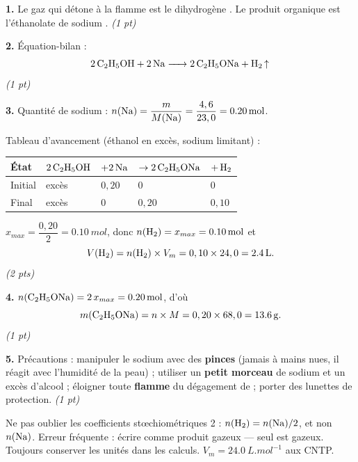 \documentclass[11pt]{article}
\newcommand{\cle}[1]{{\popxbold\color{popdark}#1}}
\begin{document}
\begin{corrige}
\textbf{1.} Le gaz qui détone à la flamme est le \cle{dihydrogène} . Le produit organique est l'\cle{éthanolate de sodium} . \hfill\textit{(1 pt)}

\textbf{2.} Équation-bilan :
\[ \ce{2 C2H5OH + 2 Na -> 2 C2H5ONa + H2 ^} \] \hfill\textit{(1 pt)}

\textbf{3.} Quantité de sodium : $n(\ce{Na}) = \dfrac{m}{M(\ce{Na})} = \dfrac{4,6}{23,0} = \SI{0,20}{mol}$.

Tableau d'avancement (éthanol en excès, sodium limitant) :
\begin{center}
\begin{tabularx}{\linewidth}{|l|X|X|X|X|}
\hline
\rowcolor{popblueL} État & $2\,\ce{C2H5OH}$ & $+2\,\ce{Na}$ & $\rightarrow 2\,\ce{C2H5ONa}$ & $+\,\ce{H2}$ \\
\hline
Initial & excès & $0,20$ & $0$ & $0$ \\
\hline
Final & excès & $0$ & $0,20$ & $0,10$ \\
\hline
\end{tabularx}
\end{center}
$x_{max} = \dfrac{0,20}{2} = \SI{0,10}{mol}$, donc $n(\ce{H2}) = x_{max} = \SI{0,10}{mol}$ et
\[ V(\ce{H2}) = n(\ce{H2}) \times V_m = 0,10 \times 24,0 = \SI{2,4}{L}. \] \hfill\textit{(2 pts)}

\textbf{4.} $n(\ce{C2H5ONa}) = 2\,x_{max} = \SI{0,20}{mol}$, d'où
\[ m(\ce{C2H5ONa}) = n \times M = 0,20 \times 68,0 = \SI{13,6}{g}. \] \hfill\textit{(1 pt)}

\textbf{5.} Précautions : manipuler le sodium avec des \textbf{pinces} (jamais à mains nues, il réagit avec l'humidité de la peau) ; utiliser un \textbf{petit morceau} de sodium et un excès d'alcool ; éloigner toute \textbf{flamme} du dégagement de  ; porter des lunettes de protection. \hfill\textit{(1 pt)}
\end{corrige}

\begin{attention}
Ne pas oublier les coefficients stœchiométriques 2 : $n(\ce{H2}) = n(\ce{Na})/2$, et non $n(\ce{Na})$. Erreur fréquente : écrire  comme produit \og gazeux \fg{} — seul  est gazeux. Toujours conserver les unités dans les calculs. $V_m = \SI{24,0}{L.mol^{-1}}$ aux CNTP.
\end{attention}
\end{document}
